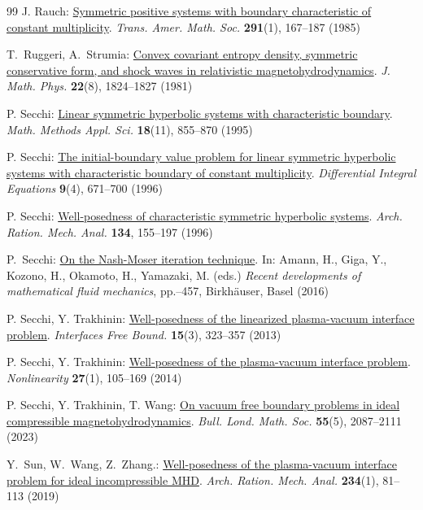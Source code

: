 \documentclass[twoside,11pt]{article}
\numberwithin{equation}{section}
\begin{document}
{\begin{thebibliography}{99}
			  J. Rauch: \href{https://doi.org/10.1090/S0002-9947-1985-0797053-4}{Symmetric positive systems with boundary characteristic of constant multiplicity}. {\it Trans. Amer. Math. Soc.} {\bf 291}(1), 167--187 (1985)
			
			
			 T.~Ruggeri, A.~Strumia: \href{https://doi.org/10.1063/1.525129}{Convex covariant entropy density, symmetric conservative form, and shock waves in relativistic magnetohydrodynamics}. {\it J. Math. Phys.} {\bf 22}(8), 1824--1827 (1981)
			
			 P. Secchi: \href{https://doi.org/10.1002/mma.1670181103}{Linear symmetric hyperbolic systems with characteristic boundary}. {\it Math. Methods Appl. Sci.} {\bf 18}(11), 855--870 (1995)
			
			 P. Secchi: \href{https://doi.org/10.57262/die/1367969881}{The initial-boundary value problem for linear symmetric hyperbolic systems with characteristic boundary of constant multiplicity}. {\it Differential Integral Equations} {\bf 9}(4), 671--700 (1996)
			
 		 P. Secchi: \href{https://doi.org/10.1007/BF00379552}{Well-posedness of characteristic symmetric hyperbolic systems}. {\it Arch. Ration. Mech. Anal.}  {\bf 134}, 155--197 (1996)
			
  P.~Secchi: \href{https://doi.org/10.1007/978-3-0348-0939-9_23}{On the Nash-Moser iteration technique}. In: Amann, H., Giga, Y., Kozono, H., Okamoto, H., Yamazaki, M. (eds.) {\it Recent developments of mathematical fluid mechanics}, pp.--457, Birkh{\"a}user, Basel (2016)
			
			  P. Secchi, Y. Trakhinin: \href{https://doi.org/10.4171/IFB/305}{Well-posedness of the linearized plasma-vacuum interface problem}. {\it Interfaces Free Bound.} {\bf 15}(3), 323--357 (2013)
			
			  P. Secchi, Y. Trakhinin: \href{https://doi.org/10.1088/0951-7715/27/1/105}{Well-posedness of the plasma-vacuum interface problem}. {\it Nonlinearity} {\bf 27}(1), 105--169 (2014)
			
			 P. Secchi, Y. Trakhinin, T. Wang: \href{https://doi.org/10.1112/blms.12913}{On vacuum free boundary problems in ideal compressible magnetohydrodynamics}. {\it Bull. Lond. Math. Soc.} {\bf 55}(5), 2087--2111 (2023)
			
 Y.~Sun, W.~Wang, Z.~Zhang.: \href{https://doi.org/10.1007/s00205-019-01386-5}{Well-posedness of the plasma-vacuum interface problem for ideal incompressible MHD}. {\it Arch. Ration. Mech. Anal.} {\bf 234}(1), 81--113 (2019)			
	

\end{thebibliography}}
\end{document}
